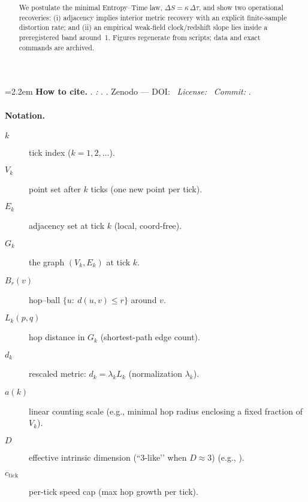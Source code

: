 \documentclass[11pt,a4paper]{article}
\title{\PaperTitleMain\\[2pt]
\large \texorpdfstring{\PaperSubtitleMath}{Delta S = k Delta tau}}
\author{\AuthorName}
\date{\PaperVersion}
\begin{document}
\maketitle

\noindent\begingroup
\setlength{\emergencystretch}{12em}\sloppy\raggedright
\hangindent=2.2em 
\textbf{How to cite.}\enspace
\AuthorNameShort. \emph{\PaperTitleMain:} \texorpdfstring{\PaperSubtitleMath}{Delta S = k Delta tau}. \PaperVersion.
Zenodo — DOI: \RepoDOIlink \textbullet\ \textit{License:} \PaperLicense \textbullet\ \textit{Commit:} \RepoCommit.%
\par\endgroup

\begin{abstract}
We postulate the minimal Entropy--Time law, $\Delta S=\kappa\,\Delta\tau$, and show two operational recoveries: (i) adjacency implies interior metric recovery with an explicit finite-sample distortion rate; and (ii) an empirical weak-field clock/redshift slope lies inside a preregistered band around~1. Figures regenerate from scripts; data and exact commands are archived.
\end{abstract}

\paragraph{Notation.}
\begin{description}
  \item[$k$] tick index ($k=1,2,\dots$).
  \item[$V_k$] point set after $k$ ticks (one new point per tick).
  \item[$E_k$] adjacency set at tick $k$ (local, coord-free).
  \item[$G_k$] the graph $(V_k,E_k)$ at tick $k$.
  \item[$B_r(v)$] hop–ball $\{u:\ d(u,v)\le r\}$ around $v$.
  \item[$L_k(p,q)$] hop distance in $G_k$ (shortest-path edge count).
  \item[$d_k$] rescaled metric: $d_k=\lambda_k L_k$ (normalization $\lambda_k$).
  \item[$a(k)$] linear counting scale (e.g., minimal hop radius enclosing a fixed fraction of $V_k$).
  \item[$D$] effective intrinsic dimension (“3-like’’ when $D\approx 3$) (e.g., \cite{falconer2014fractal,grassberger1983measuring}).
  \item[$c_{\text{tick}}$] per-tick speed cap (max hop growth per tick).
\end{description}
\end{document}

